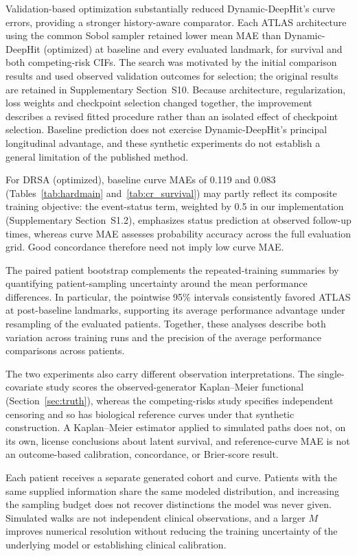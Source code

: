 Validation-based optimization substantially reduced Dynamic-DeepHit's curve errors, providing a stronger history-aware comparator. Each ATLAS architecture using the common Sobol sampler retained lower mean MAE than Dynamic-DeepHit (optimized) at baseline and every evaluated landmark, for survival and both competing-risk CIFs. The search was motivated by the initial comparison results and used observed validation outcomes for selection; the original results are retained in Supplementary Section~S10. Because architecture, regularization, loss weights and checkpoint selection changed together, the improvement describes a revised fitted procedure rather than an isolated effect of checkpoint selection. Baseline prediction does not exercise Dynamic-DeepHit's principal longitudinal advantage, and these synthetic experiments do not establish a general limitation of the published method.

For DRSA (optimized), baseline curve MAEs of 0.119 and 0.083 (Tables~\ref{tab:hardmain} and~\ref{tab:cr_survival}) may partly reflect its composite training objective: the event-status term, weighted by 0.5 in our implementation (Supplementary Section~S1.2), emphasizes status prediction at observed follow-up times, whereas curve MAE assesses probability accuracy across the full evaluation grid. Good concordance therefore need not imply low curve MAE.

The paired patient bootstrap complements the repeated-training summaries by quantifying patient-sampling uncertainty around the mean performance differences. In particular, the pointwise 95\% intervals consistently favored ATLAS at post-baseline landmarks, supporting its average performance advantage under resampling of the evaluated patients. Together, these analyses describe both variation across training runs and the precision of the average performance comparisons across patients.

The two experiments also carry different observation interpretations. The single-covariate study scores the observed-generator Kaplan--Meier functional (Section~\ref{sec:truth}), whereas the competing-risks study specifies independent censoring and so has biological reference curves under that synthetic construction. A Kaplan--Meier estimator applied to simulated paths does not, on its own, license conclusions about latent survival, and reference-curve MAE is not an outcome-based calibration, concordance, or Brier-score result.

Each patient receives a separate generated cohort and curve. Patients with the same supplied information share the same modeled distribution, and increasing the sampling budget does not recover distinctions the model was never given. Simulated walks are not independent clinical observations, and a larger $M$ improves numerical resolution without reducing the training uncertainty of the underlying model or establishing clinical calibration.

